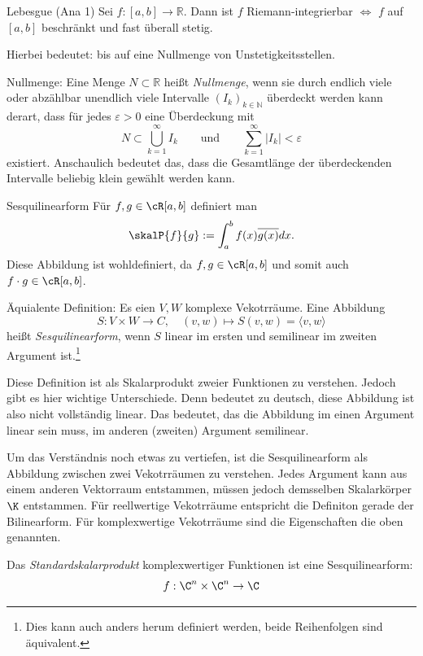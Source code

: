 \begin{satz}{Lebesgue (Ana 1)}
    Sei $f:[a,b]\to\mathbb{R}$. Dann ist $f$ Riemann-integrierbar $\Longleftrightarrow$
    $f$ auf $[a,b]$ beschränkt und fast überall stetig.

    Hierbei bedeutet: bis auf eine Nullmenge von Unstetigkeitsstellen.
    \vspace{1em}

    Nullmenge: Eine Menge $N\subset\mathbb{R}$ heißt \emph{Nullmenge}, wenn sie durch endlich viele oder abzählbar unendlich viele Intervalle $(I_k)_{k\in\mathbb{N}}$ überdeckt werden kann derart, dass für jedes $\varepsilon>0$ eine Überdeckung mit
        $$
            N\subset\bigcup_{k=1}^{\infty} I_k
            \qquad\text{und}\qquad
            \sum_{k=1}^{\infty} |I_k| < \varepsilon
        $$
    existiert. Anschaulich bedeutet das, dass die Gesamtlänge der überdeckenden Intervalle beliebig klein gewählt werden kann.
\end{satz}

\begin{definition}[deflabel=Sesquilinearform]{Sesquilinearform}
    Für $f,g \in \cR[a,b]$ definiert man
    $$
        \skalP{f}{g} := \int_a^b f(x)\overline{g(x)}dx.
    $$
    Diese Abbildung ist wohldefiniert, da $f,g \in \cR[a,b]$ und somit auch
    $f\cdot g \in \cR[a,b]$.

    \bigskip
    Äquialente Definition:
    Es eien $V,W$ komplexe Vekotrräume. Eine Abbildung
    $$
        S: V \times W \rightarrow C, \quad (v,w) \mapsto S(v,w) = \langle v, w \rangle
    $$
    heißt \emph{Sesquilinearform}, wenn $S$ linear im ersten und semilinear im zweiten Argument ist.\footnote{Dies kann auch anders herum definiert werden, beide Reihenfolgen sind äquivalent.}
\end{definition}
Diese Definition ist als Skalarprodukt zweier Funktionen zu verstehen. Jedoch gibt es hier wichtige Unterschiede. Denn bedeutet zu deutsch, diese Abbildung ist also nicht vollständig linear. 
Das bedeutet, das die Abbildung im einen Argument linear sein muss, im anderen (zweiten) Argument semilinear. 

Um das Verständnis noch etwas zu vertiefen, ist die Sesquilinearform als Abbildung zwischen zwei Vekotrräumen zu verstehen. Jedes Argument kann aus einem anderen Vektorraum entstammen, müssen jedoch demsselben Skalarkörper $\K$ entstammen. 
Für reellwertige Vekotrräume entspricht die Definiton gerade der Bilinearform. Für komplexwertige Vekotrräume sind die Eigenschaften die oben genannten. 
\begin{beispielbox}
    Das \emph{Standardskalarprodukt} komplexwertiger Funktionen ist eine Sesquilinearform:
    $$
        f : \C^n \times \C^n \to \C
    $$
\end{beispielbox}

